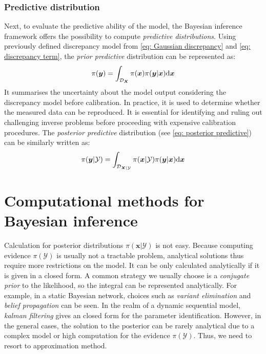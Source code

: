 \subsubsection{Predictive distribution}
Next, to evaluate the predictive ability of the model, the Bayesian inference framework offers the possibility to compute \textit{predictive distributions}. Using previously defined discrepancy model from \cref{eq: Gaussian discrepancy} and \cref{eq: discrepancy term}, the \textit{prior predictive} distribution can be represented as:
\begin{equation}
    \label{eq: prior predictive}
    \pi(\boldsymbol{y}) = \int_{\mathcal{D}_{\boldsymbol{X}}} 
    \pi(\boldsymbol{x}) \pi(\boldsymbol{y}|\boldsymbol{x}) {\rm{d}} \boldsymbol{x}
\end{equation}
It summarises the uncertainty about the model output considering the discrepancy model before calibration. In practice, it is used to determine whether the measured data can be reproduced. It is essential for identifying and ruling out challenging inverse problems before proceeding with expensive calibration procedures. The \textit{posterior predictive} distribution (see \cref{eq: posterior predictive}) can be similarly written as:
\begin{equation}
    \label{eq: posterior predictive}
    \pi(\boldsymbol{y}|\mathcal{Y}) = \int_{\mathcal{D}_{\boldsymbol{X}|\mathcal{Y}}} 
    \pi(\boldsymbol{x}|\mathcal{Y}) \pi(\boldsymbol{y}|\boldsymbol{x}) {\rm{d}} \boldsymbol{x}
\end{equation}
\section{Computational methods for Bayesian inference}
\label{section: Computational methods}
Calculation for posterior distributions $\pi(\boldsymbol{x}|\mathcal{Y})$ is not easy. Because computing evidence $\pi(\mathcal{Y})$ is usually not a tractable problem, analytical solutions thus require more restrictions on the model. It can be only calculated analytically if it is given in a closed form. A common strategy we usually choose is a \textit{conjugate prior} \citep{gelman1995} to the likelihood, so the integral can be represented analytically. For example, in a static Bayesian network, choices such as \textit{variant elimination} and \textit{belief propagation} \citep{murphy2012} can be seen. In the realm of a dynamic sequential model, \textit{kalman filtering} \citep{nguyen2016} gives an closed form for the parameter identification. However, in the general cases, the solution to the posterior can be rarely analytical due to a complex model or high computation for the evidence $\pi(\mathcal{Y})$. Thus, we need to resort to approximation method.

